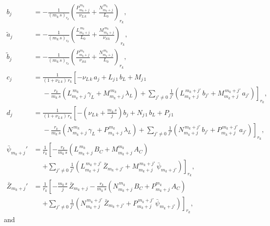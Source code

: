 \documentclass[12pt,prb,aps]{revtex4-1}
\begin{document}
\begin{align}
b_j&=- \frac{1}{(m_k\,s)_{r_k}}\left(\frac{P^{\,m_k}_{m_k+j}}{\nu_{L\,k}}+\frac{N^{\,m_k}_{m_k+j}}{L_0}\right)_{r_k},\\[0.5ex]
\tilde{a}_{j}&= -\frac{1}{(m_k\,s)_{r_k}}\left(\frac{L^{\,m_k}_{m_k+j}}{L_0}+\frac{M^{\,m_k}_{m_k+j}}{\nu_{S\,k}}\right)_{r_k},\label{e135a}\\[0.5ex]
\tilde{b}_{j}&=- \frac{1}{(m_k\,s)_{r_k}}\left(\frac{P^{\,m_k}_{m_k+j}}{\nu_{S\,k}}+\frac{N^{\,m_k}_{m_k+j}}{L_0}\right)_{r_k},\label{e138}\\[0.5ex]
c_j&= \frac{1}{(1+\nu_{L\,k})\,r_k}\left[-\nu_{L\,k}\,a_j+L_{j\,1}\,b_{L}+M_{j\,1}\phantom{\frac{1}{j}}\right.\nonumber\\[0.5ex]
&\phantom{=}-
\frac{r_k}{m_k\,s}\left(L_{m_k+j}^{\,m_k}\,\gamma_L+M_{m_k+j}^{\,m_k}\,\lambda_L\right) +\left.\sum_{j'\neq 0} \frac{1}{j'}\left(L_{m_k+j}^{\,m_k+j'}\,b_{j'}+ M_{m_k+j}^{\,m_k+j'}\,a_{j'}\right)\right]_{r_k},\\[0.5ex]
d_j&= \frac{1}{(1+\nu_{L\,k})\,r_k}\left[-\left(\nu_{L\,k}+\frac{m_k\,s}{j}\right)b_j+N_{j\,1}\,b_{L}+P_{j\,1}\right.\nonumber\\[0.5ex]
&\phantom{=}-
\frac{r_k}{m_k\,s}\left(N_{m_k+j}^{\,m_k}\,\gamma_L+P_{m_k+j}^{\,m_k}\,\lambda_L\right) +\left.\sum_{j'\neq 0} \frac{1}{j'}\left(N_{m_k+j}^{\,m_k+j'}\,b_{j'}+ P_{m_k+j}^{\,m_k+j'}\,a_{j'}\right)\right]_{r_k},\\[0.5ex]
\bar{\psi}_{m_k+j}' &= \frac{1}{r_k}\left[-\frac{r_k}{m_k\,s}\left(L_{m_k+j}^{\,m_k}\,B_C+ M_{m_k+j}^{m_k}\,A_C\right)\right.\nonumber\\[0.5ex]&\phantom{=}\left.
+ \sum_{j'\neq 0} \frac{1}{j'}\left(L_{m_k+j}^{\,m_k+j'}\,\bar{Z}_{m_k+j'} +M_{m_k+j}^{\,m_k+j'}\,\bar{\psi}_{m_k+j'}\right)\right]_{r_k},\\[0.5ex]
\bar{Z}_{m_k+j}' &= \frac{1}{r_k}\left[-\frac{m_k\,s}{j}\,\bar{Z}_{m_k+j}-\frac{r_k}{m_k\,s}\left(N_{m_k+j}^{\,m_k}\,B_C+ P_{m_k+j}^{m_k}\,A_C\right)\right.\nonumber\\[0.5ex]&\phantom{=}\left.+ 
\sum_{j'\neq 0} \frac{1}{j'}\left(N_{m_k+j}^{\,m_k+j'}\,\bar{Z}_{m_k+j'} +P_{m_k+j}^{\,m_k+j'}\,\bar{\psi}_{m_k+j'}\right)\right]_{r_k},
\end{align}
and
\end{document}
